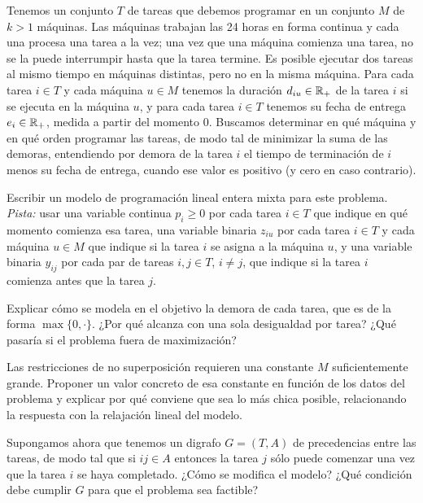 \documentclass[11pt,a4paper]{article}
\begin{document}
\newpage
Tenemos un conjunto $T$ de tareas que debemos programar en un conjunto $M$ de
$k > 1$ máquinas. Las máquinas trabajan las 24 horas en forma continua y cada
una procesa una tarea a la vez; una vez que una máquina comienza una tarea, no
se la puede interrumpir hasta que la tarea termine. Es posible ejecutar dos
tareas al mismo tiempo en máquinas distintas, pero no en la misma máquina. Para
cada tarea $i \in T$ y cada máquina $u \in M$ tenemos la duración
$d_{iu} \in \mathbb{R}_+$ de la tarea $i$ si se ejecuta en la máquina $u$, y para cada
tarea $i \in T$ tenemos su fecha de entrega $e_i \in \mathbb{R}_+$, medida a partir del
momento 0. Buscamos determinar en qué máquina y en qué orden programar las
tareas, de modo tal de minimizar la suma de las demoras, entendiendo por demora
de la tarea $i$ el tiempo de terminación de $i$ menos su fecha de entrega,
cuando ese valor es positivo (y cero en caso contrario).

\begin{puntos}
  \item Escribir un modelo de programación lineal entera mixta para este
  problema. \emph{Pista:} usar una variable continua $p_i \ge 0$ por cada tarea
  $i \in T$ que indique en qué momento comienza esa tarea, una variable binaria
  $z_{iu}$ por cada tarea $i \in T$ y cada máquina $u \in M$ que indique si la
  tarea $i$ se asigna a la máquina $u$, y una variable binaria $y_{ij}$ por cada
  par de tareas $i, j \in T$, $i \ne j$, que indique si la tarea $i$ comienza
  antes que la tarea $j$.

  \item Explicar cómo se modela en el objetivo la demora de cada tarea, que es
  de la forma $\max\{0, \cdot\}$. ¿Por qué alcanza con una sola desigualdad por
  tarea? ¿Qué pasaría si el problema fuera de maximización?

  \item Las restricciones de no superposición requieren una constante $M$
  suficientemente grande. Proponer un valor concreto de esa constante en función
  de los datos del problema y explicar por qué conviene que sea lo más chica
  posible, relacionando la respuesta con la relajación lineal del modelo.

  \item Supongamos ahora que tenemos un digrafo $G = (T, A)$ de precedencias
  entre las tareas, de modo tal que si $ij \in A$ entonces la tarea $j$ sólo
  puede comenzar una vez que la tarea $i$ se haya completado. ¿Cómo se modifica
  el modelo? ¿Qué condición debe cumplir $G$ para que el problema sea factible?
\end{puntos}
\end{document}
